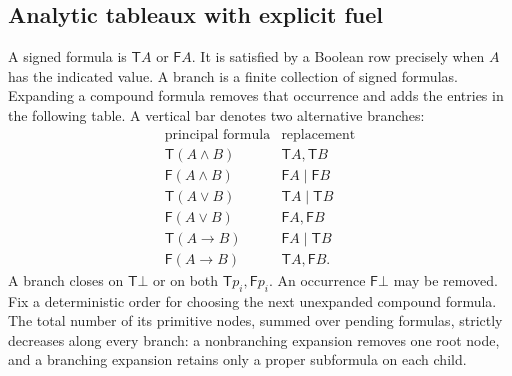 \subsection{Analytic tableaux with explicit fuel}

A signed formula is $\mathsf T A$ or $\mathsf F A$. It is satisfied by a
Boolean row precisely when $A$ has the indicated value. A branch is a
finite collection of signed formulas. Expanding a compound formula removes
that occurrence and adds the entries in the following table. A vertical
bar denotes two alternative branches:
\[
\begin{array}{c|c}
\text{principal formula}&\text{replacement}\\\hline
\mathsf T(A\wedge B)&\mathsf T A,\mathsf T B\\
\mathsf F(A\wedge B)&\mathsf F A\mid\mathsf F B\\
\mathsf T(A\vee B)&\mathsf T A\mid\mathsf T B\\
\mathsf F(A\vee B)&\mathsf F A,\mathsf F B\\
\mathsf T(A\to B)&\mathsf F A\mid\mathsf T B\\
\mathsf F(A\to B)&\mathsf T A,\mathsf F B.
\end{array}
\]
A branch closes on $\mathsf T\bot$ or on both $\mathsf T p_i,\mathsf F p_i$.
An occurrence $\mathsf F\bot$ may be removed. Fix a deterministic order for
choosing the next unexpanded compound formula. The total number of its
primitive nodes, summed over pending formulas, strictly decreases along
every branch: a nonbranching expansion removes one root node, and a
branching expansion retains only a proper subformula on each child.

